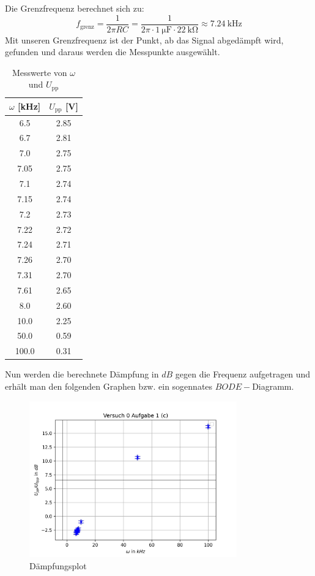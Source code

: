 \documentclass{article}
\begin{document}
\begin{enumerate}[label=\alph*]
         Die Grenzfrequenz berechnet sich zu:
         \[
         f_{\text{grenz}} = \frac{1}{2\pi R C} = \frac{1}{2\pi \cdot \SI{1}{\micro\farad} \cdot \SI{22}{\kilo\ohm}} 
         \approx \SI{7.24}{\kilo\hertz}
         \]
         Mit unseren Grenzfrequenz ist der Punkt, ab das Signal abgedämpft wird, gefunden und daraus 
         werden die Messpunkte ausgewählt. 
         \begin{table}[H]
            \centering
            \begin{tabular}{|c|c|}
            \hline
            $\omega$ [kHz] & $U_{\text{pp}}$ [V] \\
            \hline
            6.5  & 2.85 \\
            6.7  & 2.81 \\
            7.0  & 2.75 \\
            7.05 & 2.75 \\
            7.1  & 2.74 \\
            7.15 & 2.74 \\
            7.2  & 2.73 \\
            7.22 & 2.72 \\
            7.24 & 2.71 \\
            7.26 & 2.70 \\
            7.31 & 2.70 \\
            7.61 & 2.65 \\
            8.0  & 2.60 \\
            10.0 & 2.25 \\
            50.0 & 0.59 \\
            100.0 & 0.31 \\
            \hline
            \end{tabular}
            \caption{Messwerte von $\omega$ und $U_{\text{pp}}$}
            \label{tab:omega_upp}
            \end{table}
            Nun werden die berechnete Dämpfung in $dB$ gegen die Frequenz aufgetragen und erhält man 
            den folgenden Graphen bzw. ein sogennates $BODE-$Diagramm. 

         \begin{figure}[H]
             \centering
             \includegraphics[width=0.8\textwidth]{pythonAuswertungen/Versuch 0 Aufgabe 1 (c)_plot.jpg}
             \caption{Dämpfungsplot}
             \label{0_1_(c)_Dämpfung}
         \end{figure}


\end{enumerate}
\end{document}
